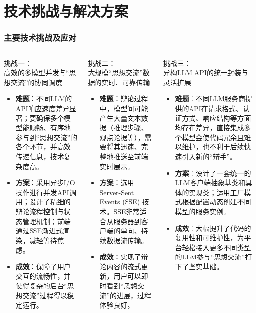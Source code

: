 \documentclass[aspectratio=169]{beamer} %
\begin{document}
\section{技术挑战与解决方案}

\begin{frame}[allowframebreaks]
\frametitle{主要技术挑战及应对}
\begin{columns}
    \begin{block}{挑战一：\\高效的多模型并发与“思想交流”的协同调度}
    \begin{itemize}
        \item \textbf{难题}：不同LLM的API响应速度差异显著；要确保多个模型能顺畅、有序地参与到“思想交流”的各个环节，并高效传递信息，技术复杂度高。
        \item \textbf{方案}：采用异步I/O操作进行并发API调用；设计了精细的辩论流程控制与状态管理机制；前端通过SSE渐进式渲染，减轻等待焦虑。
        \item \textbf{成效}：保障了用户交互的流畅性，并使得复杂的后台“思想交流”过程得以稳定运行。
    \end{itemize}
    \end{block}

    \begin{block}{挑战二：\\大规模“思想交流”数据的实时、可靠传输}
    \begin{itemize}
        \item \textbf{难题}：辩论过程中，模型间可能产生大量文本数据（推理步骤、观点论据等），需要将其迅速、完整地推送至前端实时展示。
        \item \textbf{方案}：选用Server-Sent Events (SSE) 技术。SSE非常适合从服务器到客户端的单向、持续数据流传输。
        \item \textbf{成效}：实现了辩论内容的流式更新，用户可以即时看到“思想交流”的进展，过程体验良好。
    \end{itemize}
    \end{block}

    \begin{block}{挑战三：\\异构LLM API的统一封装与灵活扩展}
    \begin{itemize}
        \item \textbf{难题}：不同LLM服务商提供的API在请求格式、认证方式、响应结构等方面均存在差异，直接集成多个模型会使代码冗余且难以维护，也不利于后续快速引入新的“辩手”。
        \item \textbf{方案}：设计了一套统一的LLM客户端抽象基类和具体的实现类；运用工厂模式根据配置动态创建不同模型的服务实例。
        \item \textbf{成效}：大幅提升了代码的复用性和可维护性，为平台轻松接入更多不同类型的LLM参与“思想交流”打下了坚实基础。
    \end{itemize}
    \end{block}
\end{columns}
\end{frame}
\end{document}
